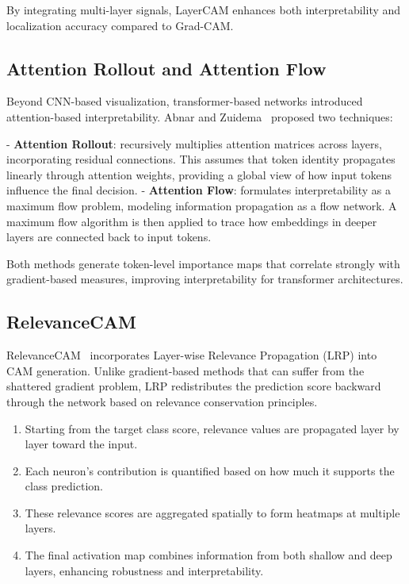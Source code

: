 By integrating multi-layer signals, LayerCAM enhances both interpretability and localization accuracy compared to Grad-CAM.

\subsection{Attention Rollout and Attention Flow}
Beyond CNN-based visualization, transformer-based networks introduced attention-based interpretability. Abnar and Zuidema~\cite{attention_rollout} proposed two techniques:

- \textbf{Attention Rollout}: recursively multiplies attention matrices across layers, incorporating residual connections. This assumes that token identity propagates linearly through attention weights, providing a global view of how input tokens influence the final decision.
- \textbf{Attention Flow}: formulates interpretability as a maximum flow problem, modeling information propagation as a flow network. A maximum flow algorithm is then applied to trace how embeddings in deeper layers are connected back to input tokens.

Both methods generate token-level importance maps that correlate strongly with gradient-based measures, improving interpretability for transformer architectures.

\subsection{RelevanceCAM}
RelevanceCAM~\cite{relevance_cam} incorporates Layer-wise Relevance Propagation (LRP) into CAM generation. Unlike gradient-based methods that can suffer from the shattered gradient problem, LRP redistributes the prediction score backward through the network based on relevance conservation principles.

\begin{enumerate}
    \item Starting from the target class score, relevance values are propagated layer by layer toward the input.
    \item Each neuron’s contribution is quantified based on how much it supports the class prediction.
    \item These relevance scores are aggregated spatially to form heatmaps at multiple layers.
    \item The final activation map combines information from both shallow and deep layers, enhancing robustness and interpretability.
\end{enumerate}


